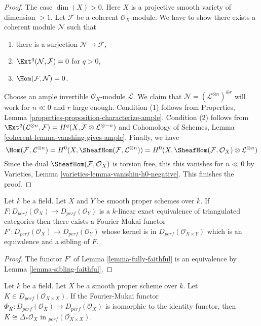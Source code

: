 \begin{proof}
\medskip\noindent
The case $\dim(X) > 0$. Here $X$ is a projective smooth
variety of dimension $> 1$. Let $\mathcal{F}$ be a coherent
$\mathcal{O}_X$-module. We have to show there exists a
coherent module $\mathcal{N}$ such that
\begin{enumerate}
\item there is a surjection $\mathcal{N} \to \mathcal{F}$,
\item $\Ext^q(\mathcal{N}, \mathcal{F}) = 0$ for $q > 0$,
\item $\Hom(\mathcal{F}, \mathcal{N}) = 0$.
\end{enumerate}
Choose an ample invertible $\mathcal{O}_X$-module $\mathcal{L}$.
We claim that $\mathcal{N} = (\mathcal{L}^{\otimes n})^{\oplus r}$
will work for $n \ll 0$ and $r$ large enough.
Condition (1) follows from
Properties, Lemma \ref{properties-proposition-characterize-ample}.
Condition (2) follows from
$\Ext^q(\mathcal{L}^{\otimes n}, \mathcal{F}) =
H^q(X, \mathcal{F} \otimes \mathcal{L}^{\otimes -n})$ and
Cohomology of Schemes, Lemma \ref{coherent-lemma-vanshing-gives-ample}.
Finally, we have
$$
\Hom(\mathcal{F}, \mathcal{L}^{\otimes n}) =
H^0(X, \SheafHom(\mathcal{F}, \mathcal{L}^{\otimes n})) =
H^0(X, \SheafHom(\mathcal{F}, \mathcal{O}_X) \otimes \mathcal{L}^{\otimes n})
$$
Since the dual $\SheafHom(\mathcal{F}, \mathcal{O}_X)$ is torsion free, this
this vanishes for $n \ll 0$ by Varieties, Lemma 
\ref{varieties-lemma-vanishin-h0-negative}. This finishes the proof.
\end{proof}

\begin{proposition}
\label{proposition-equivalence}
Let $k$ be a field. Let $X$ and $Y$ be smooth proper schemes over $k$.
If $F : D_{perf}(\mathcal{O}_X) \to D_{perf}(\mathcal{O}_Y)$
is a $k$-linear exact equivalence of triangulated categories then
there exists a Fourier-Mukai functor
$F' : D_{perf}(\mathcal{O}_X) \to D_{perf}(\mathcal{O}_Y)$ whose
kernel is in $D_{perf}(\mathcal{O}_{X \times Y})$
which is an equivalence and a sibling of $F$.
\end{proposition}

\begin{proof}
The functor $F'$ of Lemma \ref{lemma-fully-faithful}
is an equivalence by Lemma \ref{lemma-sibling-faithful}.
\end{proof}

\begin{lemma}
\label{lemma-uniqueness}
Let $k$ be a field. Let $X$ be a smooth proper scheme over $k$.
Let $K \in D_{perf}(\mathcal{O}_{X \times X})$. If the Fourier-Mukai
functor $\Phi_K : D_{perf}(\mathcal{O}_X) \to D_{perf}(\mathcal{O}_X)$
is isomorphic to the identity functor, then
$K \cong \Delta_*\mathcal{O}_X$ in $_{perf}(\mathcal{O}_{X \times X})$.
\end{lemma}

